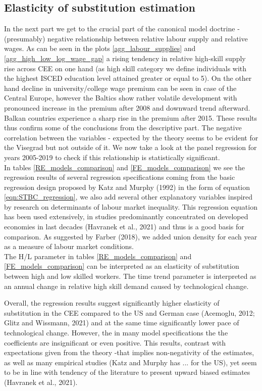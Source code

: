 \documentclass{article}
\begin{document}
\subsection{Elasticity of substitution estimation}
In the next part we get to the crucial part of the canonical model doctrine - (presumably) negative relationship between relative labour supply and relative wages. As can be seen in the plots \ref{agg_labour_supplies} and \ref{agg_high_low_log_wage_gap} a rising tendency in relative high-skill supply rise across CEE on one hand (as high skill category we define individuals with the highest ISCED education level attained greater or equal to 5). On the other hand decline in university/college wage premium can be seen in case of the Central Europe, however the Baltics show rather volatile development with pronounced increase in the premium after 2008 and downward trend afterward. Balkan countries experience a sharp rise in the premium after 2015. These results thus confirm some of the conclusions from the descriptive part. 
The negative correlation between the variables - expected by the theory seems to be evident for the Visegrad but not outside of it. We now take a look at the panel regression for years 2005-2019 to check if this relationship is statistically significant.\\
In tables \ref{RE_models_comparison} and \ref{FE_models_comparison}  we see the regression results of several regression specifications coming from the basic regression design proposed by Katz and Murphy (1992) in the form of equation \ref{eqn:STBC_regression}, we also add several other explanatory variables inspired by research on determinants of labour market inequality. This regression equation has been used extensively, in studies predominantly concentrated on developed economies in last decades (Havranek et al., 2021) and thus is a good basis for comparison. As suggested by Farber (2018), we added union density for each year as a measure of labour market conditions.\\
The H/L parameter in tables \ref{RE_models_comparison} and \ref{FE_models_comparison} can be interpreted as an elasticity of substitution between high and low skilled workers. The time trend parameter is interpreted as an annual change in relative high skill demand caused by technological change.

Overall, the regression results suggest significantly higher elasticity of substitution in the CEE compared to the US and German case (Acemoglu, 2012; Glitz and Wissmann, 2021) and at the same time significantly lower pace of technological change. However, the in many model specifications the the coefficients are insignificant or even positive. This results, contrast with expectations given from the theory -that implies non-negativity of the estimates, as well as many empirical studies (Katz and Murphy has ... for the US), yet seem to be in line with tendency of the literature to present upward biased estimates (Havranek et al., 2021).
\end{document}
